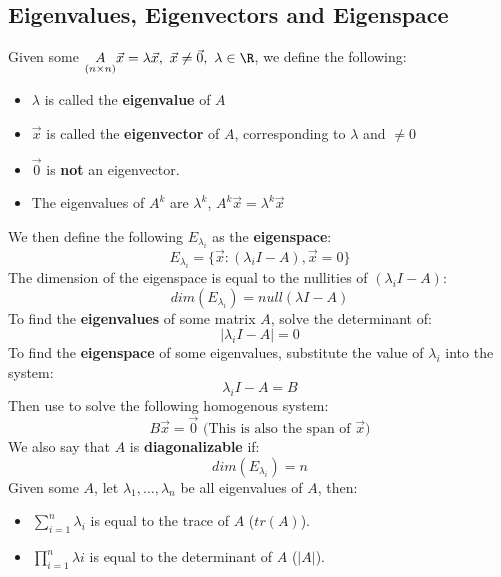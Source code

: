 \documentclass[a4paper]{article}
\begin{document}
  \subsection{Eigenvalues, Eigenvectors and Eigenspace}
  Given some $\underset{(n\times n)}{A} \vec{x} = \lambda \vec{x}, \ \vec{x} \neq \vec{0}, \ \lambda \in \R$, we define the following:
  \begin{itemize}
    \item $\lambda$ is called the \textbf{eigenvalue} of $A$
    \item $\vec{x}$ is called the \textbf{eigenvector} of $A$, corresponding to $\lambda$ and $\neq 0$
    \item $\vec{0}$ is \textbf{not} an eigenvector.
    \item The eigenvalues of $A^k$ are $\lambda^k$, $A^k \vec{x} = \lambda^k \vec{x}$
  \end{itemize}
  We then define the following $E_{\lambda_i}$ as the \textbf{eigenspace}:
  \[
    E_{\lambda_i} = \{\vec{x}: (\lambda_i I - A), \vec{x} = 0\}
  \]
  The dimension of the eigenspace is equal to the nullities of $(\lambda_i I -A)$:
  \[
    dim(E_{\lambda_i}) = null(\lambda I -A)
  \]
  To find the \textbf{eigenvalues} of some matrix $A$, solve the determinant of:
  \[
    |\lambda_i I - A| = 0
  \]
  To find the \textbf{eigenspace} of some eigenvalues, substitute the value of $\lambda_i$ into the system:
  \[
    \lambda_i I - A = B
  \]
  Then use to solve the following homogenous system:
  \[
    B \vec{x} = \vec{0} \textrm{ (This is also the span of $\vec{x}$)}
  \]
  We also say that $A$ is \textbf{diagonalizable} if:
  \[
    dim(E_{\lambda_i}) = n
  \]
  Given some $A$, let $\lambda_1, \dots, \lambda_n$ be all eigenvalues of $A$, then:
  \begin{itemize}
    \item $\sum_{i=1}^n \lambda_i$ is equal to the trace of $A$ ($tr(A)$).
    \item $\prod_{i=1}^n \lambda{i}$ is equal to the determinant of $A$ ($|A|$).
  \end{itemize}
\end{document}
